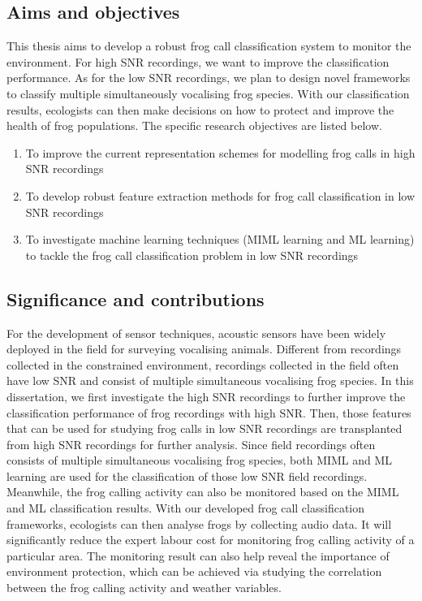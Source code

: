 \subsection{Aims and objectives}
This thesis aims to develop a robust frog call classification system to monitor the environment. For high SNR recordings, we want to improve the classification performance. As for the low SNR recordings, we plan to design novel frameworks to classify multiple simultaneously vocalising frog species. With our classification results, ecologists can then make decisions on how to protect and improve the health of frog populations. The specific research objectives are listed below.


\begin{enumerate}

\item	To improve the current representation schemes for modelling frog calls in high SNR recordings

\item 	To develop robust feature extraction methods for frog call classification in low SNR recordings 

\item   To investigate machine learning techniques (MIML learning and ML learning) to tackle the frog call classification problem in low SNR recordings

\end{enumerate}
 
 
 
\subsection{Significance and contributions}
For the development of sensor techniques, acoustic sensors have been widely deployed in the field for surveying vocalising animals. Different from recordings collected in the constrained environment, recordings collected in the field often have low SNR and consist of multiple simultaneous vocalising frog species. In this dissertation, we first investigate the high SNR recordings to further improve the classification performance of frog recordings with high SNR. 
Then, those features that can be used for studying frog calls in low SNR recordings are transplanted from high SNR recordings for further analysis.
Since field recordings often consists of multiple simultaneous vocalising frog species, both MIML and ML learning are used for the classification of those low SNR field recordings. Meanwhile, the frog calling activity can also be monitored based on the MIML and ML classification results.
With our developed frog call classification frameworks, ecologists can then analyse frogs by collecting audio data. It will significantly reduce the expert labour cost for monitoring frog calling activity of a particular area. The monitoring result can also help reveal the importance of environment protection, which can be achieved via studying the correlation between the frog calling activity and weather variables. 

